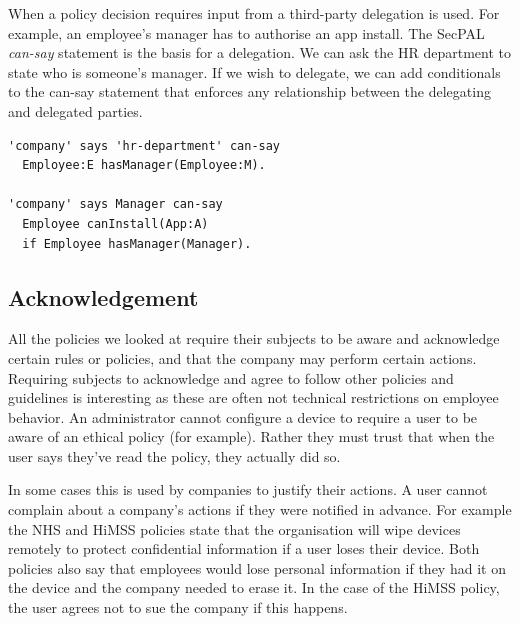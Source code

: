\documentclass[thesis.tex]{subfiles}
\begin{document}
When a policy decision requires input from a third-party delegation is used.
For example, an employee's manager has to authorise an app install.
The SecPAL \emph{can-say} statement is the basis for a delegation.
We can ask the HR department to state who is someone's manager.
If we wish to delegate, we can add conditionals to the can-say
statement that enforces any relationship between the delegating and
delegated parties.

\begin{lstlisting}
'company' says 'hr-department' can-say
  Employee:E hasManager(Employee:M).

'company' says Manager can-say
  Employee canInstall(App:A)
  if Employee hasManager(Manager).
\end{lstlisting}

\subsection{Acknowledgement}

All the policies we looked at require their subjects to be aware and
acknowledge certain rules or policies, and that the company may
perform certain actions.  Requiring subjects to acknowledge and agree
to follow other policies and guidelines is interesting as these are
often not technical restrictions on employee behavior.  An
administrator cannot configure a device to require a user to be aware
of an ethical policy (for example).  Rather they must trust that when
the user says they've read the policy, they actually did so.

In some cases this is used by companies to justify their actions.  A
user cannot complain about a company's actions if they were notified
in advance.  For example the NHS and \ac{HiMSS} policies state that
the organisation will wipe devices remotely to protect confidential
information if a user loses their device.  Both policies also say that
employees would lose personal information if they had it on the device
and the company needed to erase it.  In the case of the \ac{HiMSS} policy, the user agrees not to
sue the company if this happens.
\end{document}
